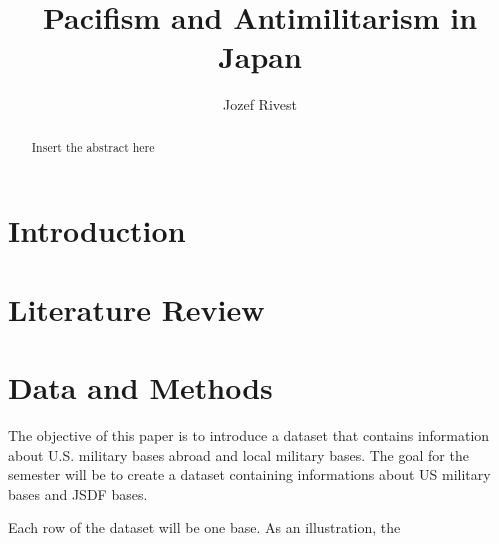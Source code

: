\documentclass{article}
\title{Pacifism and Antimilitarism in Japan}
\author{Jozef Rivest}
\date{ }
\begin{document}
\maketitle

\begin{abstract}
  Insert the abstract here
\end{abstract}

\section{Introduction}


\section{Literature Review}


\section{Data and Methods}

The objective of this paper is to introduce a dataset that contains
information about U.S. military bases abroad and local military
bases. The goal for the semester will be to create a dataset
containing informations about US military bases and JSDF bases.

Each row of the dataset will be one base. As an illustration, the 
\end{document}
